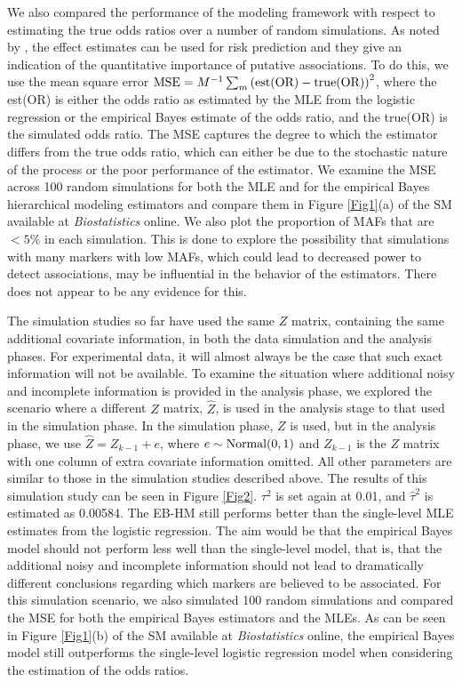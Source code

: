 We also compared the performance of the modeling framework
with respect to estimating the true odds ratios over a number
of random simulations. As noted by
\citet{Wahba:1990},
the effect estimates can be used for risk prediction and they
give an indication of the quantitative importance of putative
associations. To do this, we use the mean square error
$\hbox{MSE} = M^{-1}
\sum_m \left( \hbox{est(OR)} - \hbox{true(OR)}\right)^2$,
where the est(OR) is either the odds ratio as estimated by
the MLE from the logistic regression or the empirical Bayes
estimate of the odds ratio, and the true(OR) is the
simulated odds ratio. The MSE captures the degree to which the
estimator differs from the true odds ratio, which can either be
due to the stochastic nature of the process or the poor
performance of the estimator. We examine the MSE across 100 random
simulations for both the MLE and for the empirical Bayes
hierarchical modeling estimators and compare them in
Figure \ref{Fig1}(a) of the SM available at \textit{Biostatistics}
online. We also plot the proportion of MAFs that are $< 5\%$
in each simulation. This is done to explore the possibility
that simulations with many markers with low MAFs, which could
lead to decreased power to detect associations, may be
influential in the behavior of the estimators. There does
not appear to be any evidence for this.

The simulation studies so far have used the same $Z$ matrix,
containing the same additional covariate information, in
both the data simulation and the analysis phases. For
experimental data, it will almost always be the case that
such exact information will not be available. To examine
the situation where additional noisy and incomplete
information is provided in the analysis phase, we explored
the scenario where a different $Z$ matrix, $\hat{Z}$,
is used in the analysis stage to that used in the simulation
phase. In the simulation phase, $Z$ is used, but in the
analysis phase, we use $\hat{Z} = Z_{k - 1} + e$, where
$e \sim \hbox{Normal} (0, 1)$ and $Z_{k - 1}$ is the $Z$
matrix with one column of extra covariate information
omitted. All other parameters are similar to those in the
simulation studies described above. The results of this
simulation study can be seen in Figure \ref{Fig2}.
$\tau^2$ is set again at 0.01, and $\hat{\tau}^2$ is
estimated as 0.00584. The EB-HM still performs better
than the single-level MLE estimates from the logistic
regression. The aim would be that the empirical Bayes
model should not perform less well than the single-level
model, that is, that the additional noisy and incomplete
information should not lead to dramatically different
conclusions regarding which markers are believed to be
associated. For this simulation scenario, we also
simulated 100 random simulations and compared the
MSE for both the empirical Bayes estimators and the
MLEs. As can be seen in Figure \ref{Fig1}(b) of the
SM available at \textit{Biostatistics} online, the
empirical Bayes model still outperforms the single-level
logistic regression model when considering the estimation
of the odds ratios.


